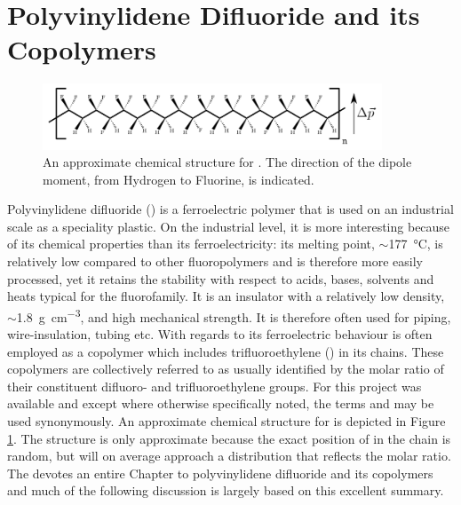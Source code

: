 \section{Polyvinylidene Difluoride and its Copolymers}
\begin{figure}[h]
\centering
	\includegraphics[width=0.9\textwidth]{./figs/chap1/pvdfstruct}
	\caption{An approximate chemical structure for \pvtr{}. The direction of the dipole moment, from Hydrogen to Fluorine, is indicated.}
	\label{fig:pvstruct}
\end{figure}
Polyvinylidene difluoride (\pvdf{}) is a ferroelectric polymer that is used on an industrial scale as a speciality plastic. On the industrial level, it is more interesting because of its chemical properties than its ferroelectricity: its melting point, $\sim$\SI{177}{\degreeCelsius}, is relatively low compared to other fluoropolymers and is therefore more easily processed, yet it retains the stability with respect to acids, bases, solvents and heats typical for the fluorofamily. It is an insulator with a relatively low density, $\sim$\SI{1.8}{\gram\per\cubic\centi\metre}, and high mechanical strength. It is therefore often used for piping, wire-insulation, tubing etc. With regards to its ferroelectric behaviour \pvdf{} is often employed as a copolymer which includes trifluoroethylene (\trfe{}) in its chains. These copolymers are collectively referred to as \pvfe{} usually identified by the molar ratio of their constituent difluoro- and trifluoroethylene groups. For this project \pvtr{} was available and except where otherwise specifically noted, the terms \pvdf{} and \pvtr{} may be used synonymously. An approximate chemical structure for \pvtr{} is depicted in Figure \ref{fig:pvstruct}. The structure is only approximate because the exact position of \trfe{} in the chain is random, but will on average approach a distribution that reflects the molar ratio.\\
The \emph{} devotes an entire Chapter to polyvinylidene difluoride and its copolymers~\cite[pp. 807-820]{encyclopedia} and much of the following discussion is largely based on this excellent summary.\\
